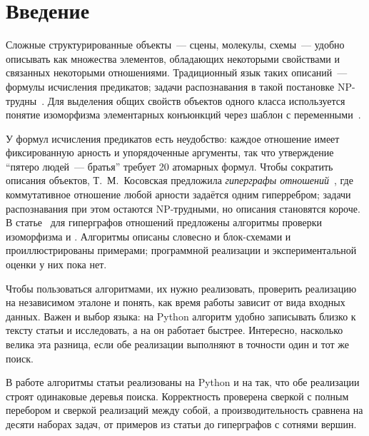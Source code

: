 
\section*{Введение}

Сложные структурированные объекты~--- сцены, молекулы, схемы~--- удобно описывать как множества элементов, обладающих некоторыми свойствами и связанных некоторыми отношениями.
Традиционный язык таких описаний~--- формулы исчисления предикатов; задачи распознавания в такой постановке NP-трудны~\cite{Kosovskaya2007}.
Для выделения общих свойств объектов одного класса используется понятие изоморфизма элементарных конъюнкций через шаблон с переменными~\cite{ZhouKosovskaya2024, KosovskayaZhou2024}.

У формул исчисления предикатов есть неудобство: каждое отношение имеет фиксированную арность и упорядоченные аргументы, так что утверждение \enquote{пятеро людей~--- братья} требует 20 атомарных формул.
Чтобы сократить описания объектов, Т.~М.~Косовская предложила \emph{гиперграфы отношений}~\cite{KosovskayaHypergraphs2025}, где коммутативное отношение любой арности задаётся одним гиперребром; задачи распознавания при этом остаются NP-трудными, но описания становятся короче.
В статье~\cite{KosovskayaIsom} для гиперграфов отношений предложены алгоритмы проверки изоморфизма \ISOMone{} и \ISOMn{}.
Алгоритмы описаны словесно и блок-схемами и проиллюстрированы примерами; программной реализации и экспериментальной оценки у них пока нет.

Чтобы пользоваться алгоритмами, их нужно реализовать, проверить реализацию на независимом эталоне и понять, как время работы зависит от вида входных данных.
Важен и выбор языка: на Python алгоритм удобно записывать близко к тексту статьи и исследовать, а на \Cpp{} он работает быстрее.
Интересно, насколько велика эта разница, если обе реализации выполняют в точности один и тот же поиск.

В работе алгоритмы статьи реализованы на Python и на \Cpp{} так, что обе реализации строят одинаковые деревья поиска.
Корректность проверена сверкой с полным перебором и сверкой реализаций между собой, а производительность сравнена на десяти наборах задач, от примеров из статьи до гиперграфов с сотнями вершин.
